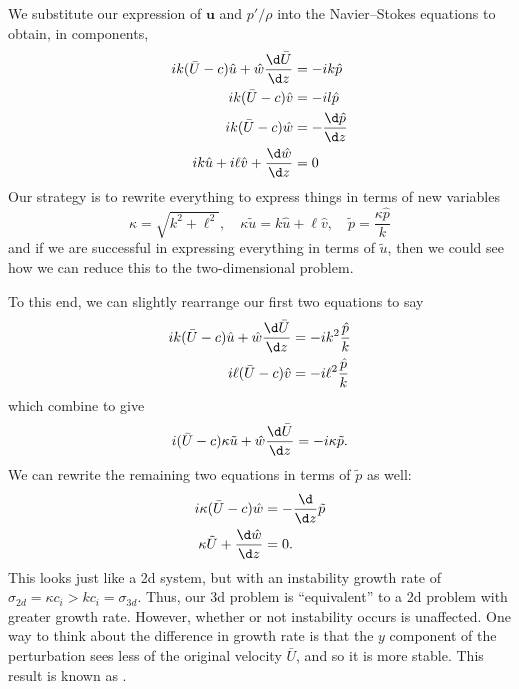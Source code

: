 \documentclass[a4paper]{article}
\begin{document}
We substitute our expression of $\mathbf{u}$ and $p'/\rho$ into the Navier--Stokes equations to obtain, in components,
\begin{align*}
  ik (\bar{U} - c) \hat{u} + \hat{w} \frac{\d \bar{U}}{\d z} &= - ik \hat{p}\\
  ik (\bar{U} - c) \hat{v} &= - il \hat{p}\\
  ik (\bar{U} - c) \hat{w} &= - \frac{\d \hat{p}}{\d z}\\
  ik \hat{u} + i\ell\hat{v} + \frac{\d\hat{w}}{\d z} &= 0
\end{align*}
Our strategy is to rewrite everything to express things in terms of new variables
\[
  \kappa = \sqrt{k^2 + \ell^2},\quad \kappa \tilde{u} = k\hat{u} + \ell\hat{v},\quad \tilde{p} = \frac{\kappa \hat{p}}{k}
\]
and if we are successful in expressing everything in terms of $\tilde{u}$, then we could see how we can reduce this to the two-dimensional problem.

To this end, we can slightly rearrange our first two equations to say
\begin{align*}
  ik (\bar{U} - c) \hat{u} + \hat{w} \frac{\d \bar{U}}{\d z} &= - ik^2 \frac{\hat{p}}{k}\\
  i\ell (\bar{U} - c) \hat{v} &= - i\ell^2 \frac{\hat{p}}{k}
\end{align*}
which combine to give
\[
  i (\bar{U} - c) \kappa \tilde{u} + \hat{w} \frac{\d \bar{U}}{\d z} = - i \kappa \tilde{p}.
\]
We can rewrite the remaining two equations in terms of $\tilde{p}$ as well:
\begin{align*}
  i \kappa (\bar{U} - c) \hat{w} &= - \frac{\d}{\d z} \tilde{p}\\
  \kappa \tilde{U} + \frac{\d \hat{w}}{\d z} &= 0.
\end{align*}
This looks just like a 2d system, but with an instability growth rate of $\sigma_{2d} = \kappa c_i > k c_i = \sigma_{3d}$. Thus, our 3d problem is ``equivalent'' to a 2d problem with greater growth rate. However, whether or not instability occurs is unaffected. One way to think about the difference in growth rate is that the $y$ component of the perturbation sees less of the original velocity $\bar{U}$, and so it is more stable. This result is known as .
\end{document}
